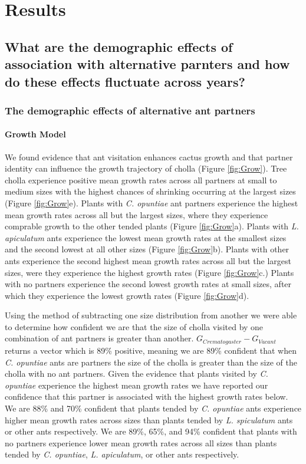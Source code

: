 \documentclass[11pt]{article}
\begin{document}
 
\section*{Results}
\subsection*{What are the demographic effects of association with alternative parnters and how do these effects fluctuate across years?}
\subsubsection*{The demographic effects of alternative ant partners}
\paragraph{Growth Model} We found evidence that ant visitation enhances cactus growth and that partner identity can influence the growth trajectory of cholla (Figure \ref{fig:Grow}). 
Tree cholla experience positive mean growth rates across all partners at small to medium sizes with the highest chances of shrinking occurring at the largest sizes (Figure \ref{fig:Grow}e).
Plants with \textit{C. opuntiae} ant partners experience the highest mean growth rates across all but the largest sizes, where they experience comprable growth to the other tended plants (Figure \ref{fig:Grow}a). 
Plants with \textit{L. apiculatum} ants experience the lowest mean growth rates at the smallest sizes and the second lowest at all other sizes (Figure \ref{fig:Grow}b). 
Plants with other ants experience the second highest mean growth rates across all but the largest sizes, were they experience the highest growth rates (Figure \ref{fig:Grow}c.)
Plants with no partners experience the second lowest growth rates at small sizes, after which they experience the lowest growth rates (Figure \ref{fig:Grow}d). 

Using the method of subtracting one size distribution from another we were able to determine how confident we are that the size of cholla visited by one combination of ant partners is greater than another. 
 $G_{Crematogaster} - G_{Vacant}$ returns a vector which is 89\% positive, meaning we are 89\% confident that when \textit{C. opuntiae} ants are partners the size of the cholla is greater than the size of the cholla with no ant partners.
Given the evidence that plants visited by \textit{C. opuntiae} experience the highest mean growth rates we have reported our confidence that this partner is associated with the highest growth rates below. 
We are 88\% and 70\% confident that plants tended by \textit{C. opuntiae} ants experience higher mean growth rates across sizes than plants tended by \textit{L. spiculatum} ants or other ants respectively.
We are 89\%, 65\%, and 94\% confident that plants with no partners experience lower mean growth rates across all sizes than plants tended by \textit{C. opuntiae}, \textit{L. apiculatum}, or other ants respectively.
\end{document}
